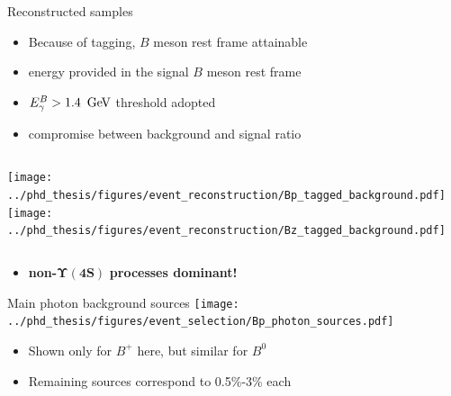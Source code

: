 \documentclass[xcolor=dvipsnames]{beamer}
\begin{document}
\begin{frame}{Reconstructed samples}
   \scriptsize
   \begin{itemize}
      \item Because of tagging, $B$ meson rest frame attainable
      \item[\ra] energy provided in the signal $B$ meson rest frame
      \item ${E^B_{\gamma}}>1.4~\mathrm{\,Ge\kern -0.1em V}$ threshold adopted
      \item[\ra] compromise between background and signal ratio
   \end{itemize}
   \begin{columns}
      \texttt{[image: ../phd\_thesis/figures/event\_reconstruction/Bp\_tagged\_background.pdf]}
      \texttt{[image: ../phd\_thesis/figures/event\_reconstruction/Bz\_tagged\_background.pdf]}
   \end{columns}
   \begin{itemize}
      \item[\ra] \textbf{non-}$\bm{\Upsilon(4S)}$ \textbf{processes dominant!}
   \end{itemize}
\end{frame}

\begin{frame}{Main photon background sources}
\centering\scriptsize
      \texttt{[image: ../phd\_thesis/figures/event\_selection/Bp\_photon\_sources.pdf]}

      \begin{itemize}
         \item Shown only for $B^+$ here, but similar for $B^0$
         \item Remaining sources correspond to 0.5\%-3\% each 
      \end{itemize}


\end{frame}
\end{document}
